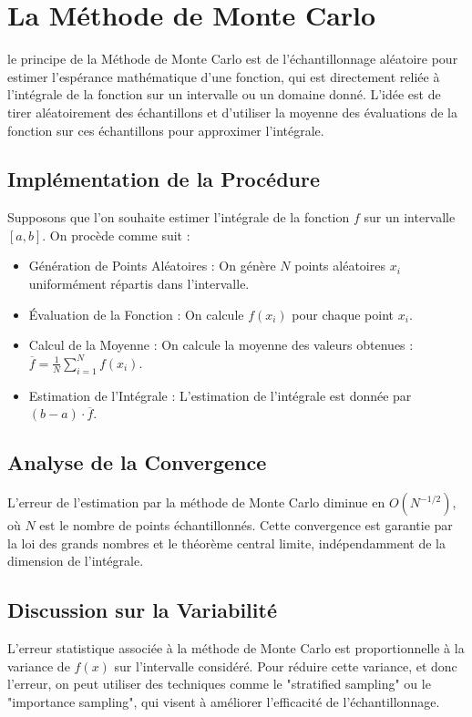 \documentclass[12pt,a4paper]{article}
\begin{document}
\section{La Méthode de Monte Carlo}
le principe de la Méthode de Monte Carlo est de l'échantillonnage aléatoire pour estimer l'espérance mathématique d'une fonction, qui est directement reliée à l'intégrale de la fonction sur un intervalle ou un domaine donné. L'idée est de tirer aléatoirement des échantillons et d'utiliser la moyenne des évaluations de la fonction sur ces échantillons pour approximer l'intégrale.

\subsection{Implémentation de la Procédure}
Supposons que l'on souhaite estimer l'intégrale de la fonction $f$ sur un intervalle $[a, b]$. On procède comme suit :
\begin{itemize}
  \item Génération de Points Aléatoires : On génère $N$ points aléatoires $x_i$ uniformément répartis dans l'intervalle.
  \item Évaluation de la Fonction : On calcule $f(x_i)$ pour chaque point $x_i$.
  \item Calcul de la Moyenne : On calcule la moyenne des valeurs obtenues : $\overline{f} = \frac{1}{N} \sum_{i=1}^N f(x_i)$.
  \item Estimation de l'Intégrale : L'estimation de l'intégrale est donnée par $(b-a) \cdot \overline{f}$.
\end{itemize}


\subsection{Analyse de la Convergence}
L'erreur de l'estimation par la méthode de Monte Carlo diminue en $O(N^{-1/2})$, où $N$ est le nombre de points échantillonnés. Cette convergence est garantie par la loi des grands nombres et le théorème central limite, indépendamment de la dimension de l'intégrale.

\subsection{Discussion sur la Variabilité}
L'erreur statistique associée à la méthode de Monte Carlo est proportionnelle à la variance de $f(x)$ sur l'intervalle considéré. Pour réduire cette variance, et donc l'erreur, on peut utiliser des techniques comme le "stratified sampling" ou le "importance sampling", qui visent à améliorer l'efficacité de l'échantillonnage.
\\
\end{document}
